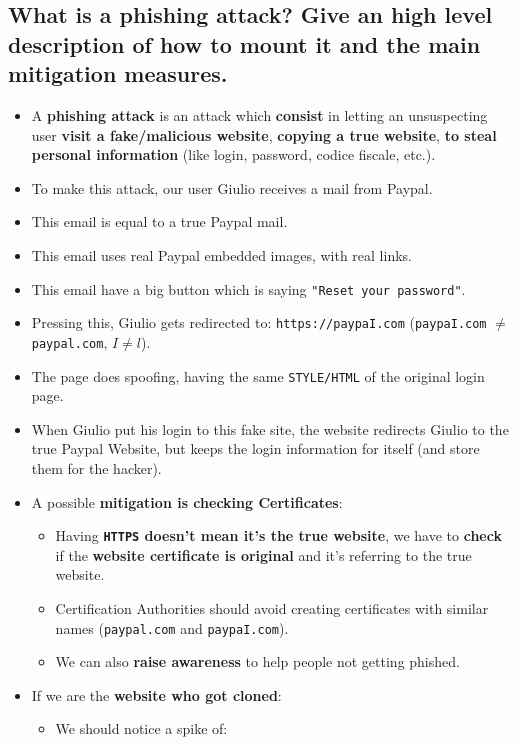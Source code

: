 \documentclass[9pt, letterpaper]{article}
\begin{document}
\newpage

\subsection{What is a phishing attack? Give an high level description of how to mount it and the main mitigation measures.}
\begin{itemize}
	\item A \textbf{phishing attack }is an attack which \textbf{consist} in letting an unsuspecting user \textbf{visit a fake/malicious website}, \textbf{copying a true website}, \textbf{to steal personal information} (like login, password, codice fiscale, etc.).
	\item To make this attack, our user Giulio receives a mail from Paypal.
	\item This email is equal to a true Paypal mail.
	\item This email uses real Paypal embedded images, with real links.
	\item This email have a big button which is saying {\tt "Reset your password"}.
	\item Pressing this, Giulio gets redirected to: {\tt https://paypaI.com} ({\tt paypaI.com} $\neq$ {\tt paypal.com}, $I\ne l$).
	\item The page does spoofing, having the same {\tt STYLE/HTML} of the original login page.
	\item When Giulio put his login to this fake site, the website redirects Giulio to the true Paypal Website, but keeps the login information for itself (and store them for the hacker).
	\item A possible \textbf{mitigation is checking Certificates}:
	      \begin{itemize}
		      \item Having \textbf{{\tt HTTPS} doesn't mean it's the true website}, we have to \textbf{check} if the \textbf{website certificate is original} and it's referring to the true website.
		      \item Certification Authorities should avoid creating certificates with similar names ({\tt paypal.com} and {\tt paypaI.com}).
		      \item We can also \textbf{raise awareness} to help people not getting phished.
	      \end{itemize}
	\item If we are the \textbf{website who got cloned}:
	      \begin{itemize}
		      \item We should notice a spike of:

\end{itemize}
\end{itemize}
\end{document}
